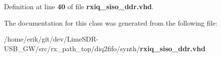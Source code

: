 Definition at line {\bf 40} of file {\bf rxiq\+\_\+siso\+\_\+ddr.\+vhd}.



The documentation for this class was generated from the following file\+:\begin{DoxyCompactItemize}
\item 
/home/erik/git/dev/\+Lime\+S\+D\+R-\/\+U\+S\+B\+\_\+\+G\+W/src/rx\+\_\+path\+\_\+top/diq2fifo/synth/{\bf rxiq\+\_\+siso\+\_\+ddr.\+vhd}\end{DoxyCompactItemize}
